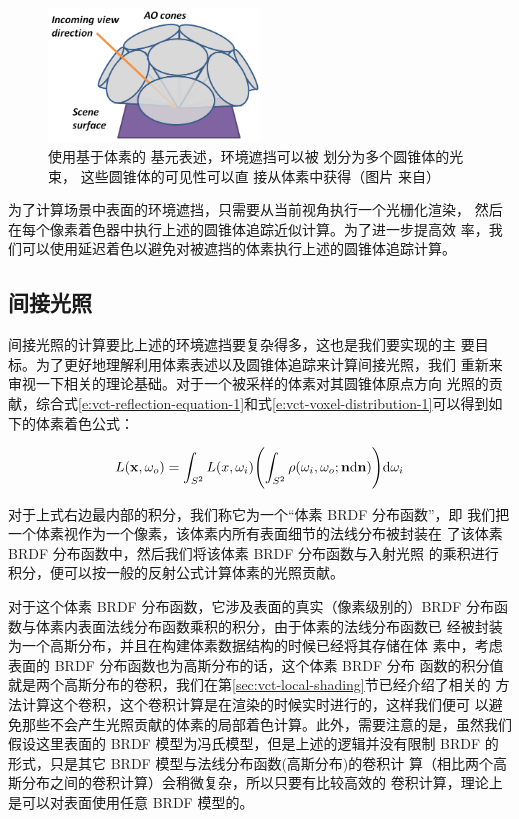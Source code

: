\begin{figure}
	\sidecaption
	\includegraphics[width=0.5\textwidth]{figures/vct/vct-14-1}
	\caption{使用基于体素的 基元表述，环境遮挡可以被 划分为多个圆锥体的光束， 这些圆锥体的可见性可以直 接从体素中获得（图片 来自\cite{a:InteractiveIndirectIlluminationUsingVoxelConeTracing}）}
	\label{f:vct-14-1}
\end{figure}

为了计算场景中表面的环境遮挡，只需要从当前视角执行一个光栅化渲染， 然后在每个像素着色器中执行上述的圆锥体追踪近似计算。为了进一步提高效 率，我们可以使用延迟着色以避免对被遮挡的体素执行上述的圆锥体追踪计算。



\subsection{间接光照}
间接光照的计算要比上述的环境遮挡要复杂得多，这也是我们要实现的主 要目标。为了更好地理解利用体素表述以及圆锥体追踪来计算间接光照，我们 重新来审视一下相关的理论基础。对于一个被采样的体素对其圆锥体原点方向 光照的贡献，综合式\ref{e:vct-reflection-equation-1}和式\ref{e:vct-voxel-distribution-1}可以得到如下的体素着色公式：

\begin{equation}\label{e:vct-voxel-shading}
	L(\mathbf{x},\omega_o)=\int_{S^{2}}L(x,\omega_i)\Biggl(\int_{S^{2}}\rho(\omega_i,\omega_o;\mathbf{n}{\rm d}\mathbf{n})\Biggl){\rm d}\omega_i
\end{equation}

对于上式右边最内部的积分，我们称它为一个“体素 BRDF 分布函数”，即 我们把一个体素视作为一个像素，该体素内所有表面细节的法线分布被封装在 了该体素 BRDF 分布函数中，然后我们将该体素 BRDF 分布函数与入射光照 的乘积进行积分，便可以按一般的反射公式计算体素的光照贡献。

对于这个体素 BRDF 分布函数，它涉及表面的真实（像素级别的）BRDF 分布函数与体素内表面法线分布函数乘积的积分，由于体素的法线分布函数已 经被封装为一个高斯分布，并且在构建体素数据结构的时候已经将其存储在体 素中，考虑表面的 BRDF 分布函数也为高斯分布的话，这个体素 BRDF 分布 函数的积分值就是两个高斯分布的卷积，我们在第\ref{sec:vct-local-shading}节已经介绍了相关的 方法计算这个卷积，这个卷积计算是在渲染的时候实时进行的，这样我们便可 以避免那些不会产生光照贡献的体素的局部着色计算。此外，需要注意的是，虽然我们假设这里表面的 BRDF 模型为冯氏模型，但是上述的逻辑并没有限制 BRDF 的形式，只是其它 BRDF 模型与法线分布函数(高斯分布)的卷积计 算（相比两个高斯分布之间的卷积计算）会稍微复杂，所以只要有比较高效的 卷积计算，理论上是可以对表面使用任意 BRDF 模型的。

